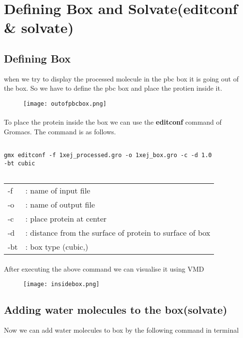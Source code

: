 \section{Defining Box and Solvate(editconf \& solvate)}
\subsection{Defining Box}
when we try to display the processed molecule in the pbc box it is going out of the box. So we have to define the pbc box and place the protien inside it.
\begin{figure}[h]
\centering
\texttt{[image: outofpbcbox.png]}
\end{figure}
\paragraph{}
To place the protein inside the box we can use the \textbf{editconf} command of Gromacs. The command is as follows.
\begin{verbatim}

gmx editconf -f 1xej_processed.gro -o 1xej_box.gro -c -d 1.0 
-bt cubic
    
\end{verbatim}

\begin{tabular}{l l}
     -f & : name of input file  \\
     -o & : name of output file \\
     -c & : place protein at center\\
     -d & : distance from the surface of protein to surface of box\\
     -bt & : box type (cubic,)
\end{tabular}
\paragraph{}
 After executing the above command we can visualise it using  VMD

\begin{figure}[h]
\centering
\texttt{[image: insidebox.png]}
\end{figure}

\subsection{Adding water molecules to the box(solvate)}
Now we can add water molecules to box by the following command in terminal
\vspace{1cm}

